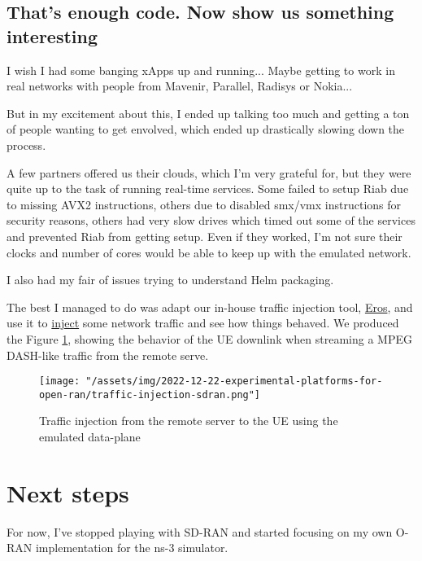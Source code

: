 \documentclass{article}
\begin{document}
    \subsection{That's enough code. Now show us something interesting}
        I wish I had some banging xApps up and running... Maybe getting to work in real
        networks with people from Mavenir, Parallel, Radisys or Nokia...

        But in my excitement about this, I ended up talking too much and getting a ton
        of people wanting to get envolved, which ended up drastically slowing down the process.

        A few partners offered us their clouds, which I'm very grateful for, but they were quite
        up to the task of running real-time services. Some failed to setup Riab due to missing AVX2
        instructions, others due to disabled smx/vmx instructions for security reasons, others
        had very slow drives which timed out some of the services and prevented Riab from getting
        setup. Even if they worked, I'm not sure their clocks and number of cores would be able to keep up
        with the emulated network.

        I also had my fair of issues trying to understand Helm packaging.

        The best I managed to do was adapt our in-house traffic injection tool,
        \href{https://github.com/notopoloko/Eros}{Eros}, and use it
        to  \href{https://github.com/Gabrielcarvfer/sdran-in-a-box/blob/work/inject_eros_traffic.py}{inject}
        some network traffic and see how things behaved. We produced the Figure \ref{fig:traffic-injection},
        showing the behavior of the UE downlink when streaming a MPEG DASH-like traffic from the remote serve.

        \begin{figure}
            \texttt{[image: "/assets/img/2022-12-22-experimental-platforms-for-open-ran/traffic-injection-sdran.png"]}
            \caption{Traffic injection from the remote server to the UE using the emulated data-plane}
            \label{fig:traffic-injection}
        \end{figure}


\section{Next steps}
    For now, I've stopped playing with SD-RAN and started focusing on my own O-RAN implementation
    for the ns-3 simulator.
\end{document}
